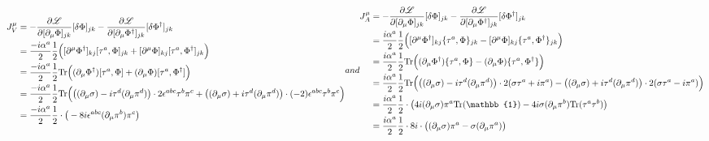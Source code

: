 \begin{subequations}
    \begin{align}
        J^\mu_V & =-\frac{\partial\mathscr{L}}{\partial[\partial_\mu\Phi]_{jk}}[\delta\Phi]_{jk}-\frac{\partial\mathscr{L}}{\partial[\partial_\mu\Phi^\dagger]_{jk}}[\delta\Phi^\dagger]_{jk}                                                                      \\
                & =\frac{-\imagu\alpha^a}{2}\frac{1}{2}\Big([\partial^\mu\Phi^\dagger]_{kj}[\tau^a,\Phi]_{jk}+[\partial^\mu\Phi]_{kj}[\tau^a,\Phi^\dagger]_{jk}\Big)                                                                                               \\
                & =\frac{-\imagu\alpha^a}{2}\frac{1}{2}\Tr\Big((\partial_\mu\Phi^\dagger)[\tau^a,\Phi]+(\partial_\mu\Phi)[\tau^a,\Phi^\dagger]\Big)                                                                                                                \\
                & =\frac{-\imagu\alpha^a}{2}\frac{1}{2}\Tr\Big(\big((\partial_\mu\sigma)-\imagu\tau^d(\partial_\mu\pi^d)\big)\cdot2\epsilon^{abc}\tau^b\pi^c+\big((\partial_\mu\sigma)+\imagu\tau^d(\partial_\mu\pi^d)\big)\cdot(-2)\epsilon^{abc}\tau^b\pi^c\Big) \\
                & =\frac{-\imagu\alpha^a}{2}\frac{1}{2}\cdot\big(-8\imagu\epsilon^{abc}(\partial_\mu\pi^b)\pi^c\big)
    \end{align}
    and
    \begin{align}
        J^\mu_A & =-\frac{\partial\mathscr{L}}{\partial[\partial_\mu\Phi]_{jk}}[\delta\Phi]_{jk}-\frac{\partial\mathscr{L}}{\partial[\partial_\mu\Phi^\dagger]_{jk}}[\delta\Phi^\dagger]_{jk}                                                                    \\
                & =\frac{\imagu\alpha^a}{2}\frac{1}{2}\Big([\partial^\mu\Phi^\dagger]_{kj}\{\tau^a,\Phi\}_{jk}-[\partial^\mu\Phi]_{kj}\{\tau^a,\Phi^\dagger\}_{jk}\Big)                                                                                          \\
                & =\frac{\imagu\alpha^a}{2}\frac{1}{2}\Tr\Big((\partial_\mu\Phi^\dagger)\{\tau^a,\Phi\}-(\partial_\mu\Phi)\{\tau^a,\Phi^\dagger\}\Big)                                                                                                           \\
                & =\frac{\imagu\alpha^a}{2}\frac{1}{2}\Tr\Big(\big((\partial_\mu\sigma)-\imagu\tau^d(\partial_\mu\pi^d)\big)\cdot2(\sigma\tau^a+\imagu\pi^a)-\big((\partial_\mu\sigma)+\imagu\tau^d(\partial_\mu\pi^d)\big)\cdot2(\sigma\tau^a-\imagu\pi^a)\Big) \\
                & =\frac{\imagu\alpha^a}{2}\frac{1}{2}\cdot\big(4\imagu(\partial_\mu\sigma)\pi^a\Tr(\mathbb{1})-4\imagu\sigma(\partial_\mu\pi^b)\Tr(\tau^a\tau^b)\big)                                                                                           \\
                & =\frac{\imagu\alpha^a}{2}\frac{1}{2}\cdot8\imagu\cdot\big((\partial_\mu\sigma)\pi^a-\sigma(\partial_\mu\pi^a)\big)
    \end{align}
\end{subequations}

